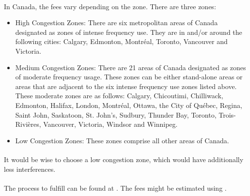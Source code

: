 \paragraph{}In Canada, the fees vary depending on the zone. There are three zones:
\begin{itemize}
\item High Congestion Zones: There are six metropolitan areas of Canada designated as zones of intense frequency use. They are in and/or around the following cities: Calgary, Edmonton, Montréal, Toronto, Vancouver and Victoria.
\item Medium Congestion Zones: There are 21 areas of Canada designated as zones of moderate frequency usage. These zones can be either stand-alone areas or areas that are adjacent to the six intense frequency use zones listed above. These moderate zones are as follows: Calgary, Chicoutimi, Chilliwack, Edmonton, Halifax, London, Montréal, Ottawa, the City of Québec, Regina, Saint John, Saskatoon, St. John's, Sudbury, Thunder Bay, Toronto, Trois-Rivières, Vancouver, Victoria, Windsor and Winnipeg.
\item Low Congestion Zones: These zones comprise all other areas of Canada.
\end{itemize}

\paragraph{}It would be wise to choose a low congestion zone, which would have additionally less interferences. 

\paragraph{}The process to fulfill can be found at \cite{CndForm}. The fees might be estimated using \cite{CndFees}.